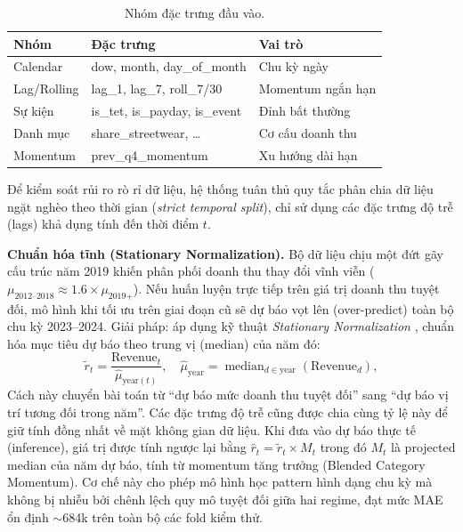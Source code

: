 \documentclass{article}
\begin{document}
\begin{table}[h]
\centering
\caption{Nhóm đặc trưng đầu vào.}
\label{tab:features}
\small\setlength\tabcolsep{4pt}
\begin{tabular}{lll}
\toprule
\textbf{Nhóm} & \textbf{Đặc trưng} & \textbf{Vai trò} \\
\midrule
Calendar    & dow, month, day\_of\_month  & Chu kỳ ngày \\
Lag/Rolling & lag\_1, lag\_7, roll\_7/30 & Momentum ngắn hạn \\
Sự kiện     & is\_tet, is\_payday, is\_event & Đỉnh bất thường \\
Danh mục    & share\_streetwear, \ldots   & Cơ cấu doanh thu \\
Momentum    & prev\_q4\_momentum          & Xu hướng dài hạn \\
\bottomrule
\end{tabular}
\end{table}

Để kiểm soát rủi ro rò rỉ dữ liệu, hệ thống tuân thủ quy tắc phân chia dữ liệu ngặt nghèo theo thời gian (\textit{strict temporal split}), chỉ sử dụng các đặc trưng độ trễ (lags) khả dụng tính đến thời điểm $t$.

\textbf{Chuẩn hóa tĩnh (Stationary Normalization).}
Bộ dữ liệu chịu một đứt gãy cấu trúc năm 2019 khiến phân phối doanh thu
thay đổi vĩnh viễn ($\mu_{\text{2012--2018}} \approx 1.6\times\mu_{\text{2019+}}$).
Nếu huấn luyện trực tiếp trên giá trị doanh thu tuyệt đối, mô hình khi tối ưu trên
giai đoạn cũ sẽ dự báo vọt lên (over-predict) toàn bộ chu kỳ 2023--2024.
Giải pháp: áp dụng kỹ thuật \textit{Stationary Normalization} \cite{stationary}, chuẩn hóa mục tiêu dự báo theo trung vị (median) của năm đó:
\begin{equation}
  \tilde{r}_t = \frac{\text{Revenue}_t}{\hat{\mu}_{\text{year}(t)}},
  \quad \hat{\mu}_{\text{year}} = \operatorname{median}_{d\in\text{year}}(\text{Revenue}_d),
\end{equation}
Cách này chuyển bài toán từ ``dự báo mức doanh thu tuyệt đối'' sang
``dự báo vị trí tương đối trong năm''.
Các đặc trưng độ trễ cũng được chia cùng tỷ lệ này để
giữ tính đồng nhất về mặt không gian dữ liệu.
Khi đưa vào dự báo thực tế (inference), giá trị được tính ngược lại bằng $\hat{r}_t = \tilde{r}_t \times M_t$
trong đó $M_t$ là projected median của năm dự báo, tính từ momentum tăng trưởng
(Blended Category Momentum). Cơ chế này cho phép mô hình học pattern hình dạng chu kỳ mà không bị nhiễu bởi chênh lệch quy mô tuyệt đối giữa hai regime, đạt mức MAE ổn định $\sim$684k trên toàn bộ các fold kiểm thử.
\end{document}
